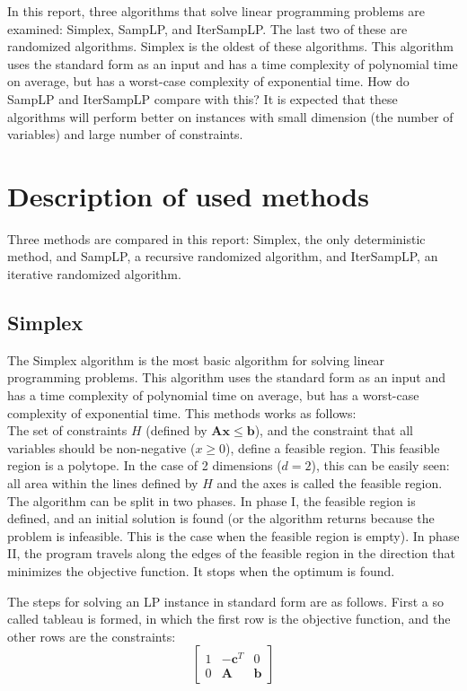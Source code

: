 \documentclass[nocopyrightspace]{acm_proc_article-sp}
\begin{document}
In this report, three algorithms that solve linear programming problems are examined: Simplex, SampLP, and IterSampLP. The last two of these are randomized algorithms. Simplex is the oldest of these algorithms. This algorithm uses the standard form as an input and has a time complexity of polynomial time on average, but has a worst-case complexity of exponential time. How do SampLP and IterSampLP compare with this? It is expected that these algorithms will perform better on instances with small dimension (the number of variables) and large number of constraints. 

\section{Description of used methods}
Three methods are compared  in this report: Simplex, the only deterministic method, and SampLP, a recursive randomized algorithm, and IterSampLP, an iterative randomized algorithm.
\subsection{Simplex}
The Simplex algorithm \cite{dantzig1951maximization} is the most basic algorithm for solving linear programming problems. This algorithm uses the standard form as an input and has a time complexity of polynomial time on average, but has a worst-case complexity of exponential time. This methods works as follows: \\
The set of constraints $H$ (defined by $\mathbf{Ax} \leq \mathbf{b}$), and the constraint that all variables should be non-negative ($x \geq 0$), define a feasible region. This feasible region is a polytope. In the case of 2 dimensions ($d=2$), this can be easily seen: all area within the lines defined by $H$ and the axes is called the feasible region. \\
The algorithm can be split in two phases. In phase I, the feasible region is defined, and an initial solution is found (or the algorithm returns because the problem is infeasible. This is the case when the feasible region is empty). In phase II, the program travels along the edges of the feasible region in the direction that minimizes the objective function. It stops when the optimum is found.

The steps for solving an LP instance in standard form are as follows. First a so called tableau is formed, in which the first row is the objective function, and the other rows are the constraints:
\[
\begin{bmatrix}
1 & -\mathbf{c}^T & 0 \\
0 & \mathbf{A} & \mathbf{b}
\end{bmatrix} \]
\end{document}
